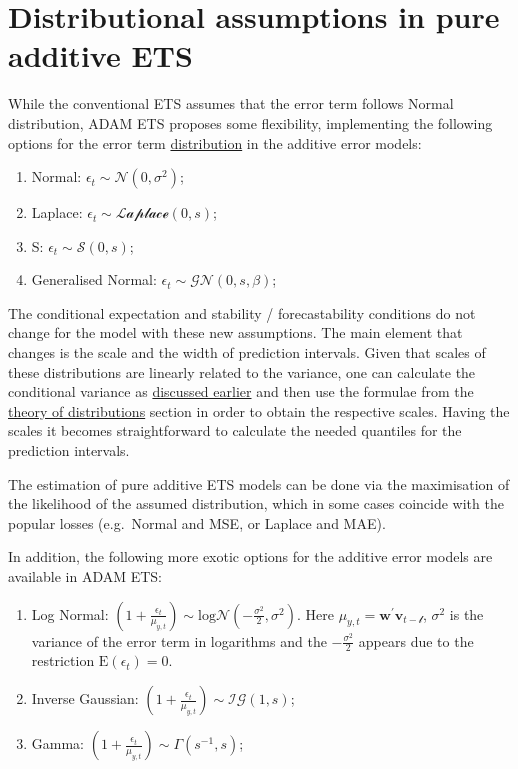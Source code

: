 \documentclass[
]{book}
\providecommand{\tightlist}{%
  \setlength{\itemsep}{0pt}\setlength{\parskip}{0pt}}
\theoremstyle{definition}
\theoremstyle{definition}
\theoremstyle{definition}
\theoremstyle{definition}
\theoremstyle{remark}
\begin{document}
\hypertarget{ADAMETSAdditiveDistributions}{%
\section{Distributional assumptions in pure additive ETS}\label{ADAMETSAdditiveDistributions}}

While the conventional ETS assumes that the error term follows Normal distribution, ADAM ETS proposes some flexibility, implementing the following options for the error term \protect\hyperlink{distributions}{distribution} in the additive error models:

\begin{enumerate}
\def\labelenumi{\arabic{enumi}.}
\tightlist
\item
  Normal: \(\epsilon_t \sim \mathcal{N}(0, \sigma^2)\);
\item
  Laplace: \(\epsilon_t \sim \mathcal{Laplace}(0, s)\);
\item
  S: \(\epsilon_t \sim \mathcal{S}(0, s)\);
\item
  Generalised Normal: \(\epsilon_t \sim \mathcal{GN}(0, s, \beta)\);
\end{enumerate}

The conditional expectation and stability / forecastability conditions do not change for the model with these new assumptions. The main element that changes is the scale and the width of prediction intervals. Given that scales of these distributions are linearly related to the variance, one can calculate the conditional variance as \protect\hyperlink{pureAdditiveExpectationAndVariance}{discussed earlier} and then use the formulae from the \protect\hyperlink{distributions}{theory of distributions} section in order to obtain the respective scales. Having the scales it becomes straightforward to calculate the needed quantiles for the prediction intervals.

The estimation of pure additive ETS models can be done via the maximisation of the likelihood of the assumed distribution, which in some cases coincide with the popular losses (e.g.~Normal and MSE, or Laplace and MAE).

In addition, the following more exotic options for the additive error models are available in ADAM ETS:

\begin{enumerate}
\def\labelenumi{\arabic{enumi}.}
\tightlist
\item
  Log Normal: \(\left(1+\frac{\epsilon_t}{\mu_{y,t}} \right) \sim \text{log}\mathcal{N}\left(-\frac{\sigma^2}{2}, \sigma^2\right)\).
  Here \(\mu_{y,t} = \mathbf{w}^\prime \mathbf{v}_{t-\boldsymbol{\mathscr{l}}}\), \(\sigma^2\) is the variance of the error term in logarithms and the \(-\frac{\sigma^2}{2}\) appears due to the restriction \(\text{E}(\epsilon_t)=0\).
\item
  Inverse Gaussian: \(\left(1+\frac{\epsilon_t}{\mu_{y,t}} \right) \sim \mathcal{IG}(1, s)\);
\item
  Gamma: \(\left(1+\frac{\epsilon_t}{\mu_{y,t}} \right) \sim \mathcal{\Gamma}(s^{-1}, s)\);
\end{enumerate}
\end{document}
